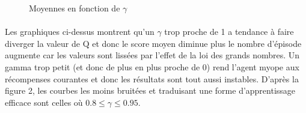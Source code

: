 \documentclass[12pt,oneside,a4paper]{article}
\begin{document}
\begin{figure}[hbt!]
{        }
        \hspace{0mm}
        \caption{Moyennes en fonction de $\gamma$}
    \end{figure}

    \paragraph{}
    Les graphiques ci-dessus montrent qu'un $\gamma$ trop proche de 1 a tendance à faire diverger la
    valeur de $\mathrm{Q}$ et donc le score moyen diminue plus le nombre d'épisode augmente car les valeurs sont lissées
    par l'effet de la loi des grands nombres. Un gamma trop petit (et donc de plus en plus proche de 0)
    rend l'agent myope aux récompenses courantes et donc les résultats sont tout aussi instables. D'après la figure 2,
    les courbes les moins bruitées et traduisant une forme d'apprentissage efficace sont celles où
    $0.8 \leq \gamma \leq 0.95$.
    \newpage
\end{document}
